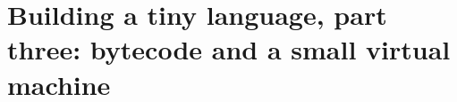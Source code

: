 \chapter{Building a tiny language, part three: bytecode and a small virtual machine}
\label{ch:building-a-tiny-language-part-three}


